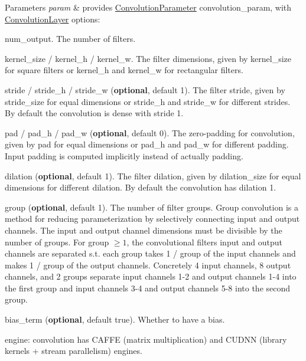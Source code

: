 \begin{DoxyParams}{Parameters}
{\em param} & provides \mbox{\hyperlink{classcaffe_1_1_convolution_parameter}{Convolution\+Parameter}} convolution\+\_\+param, with \mbox{\hyperlink{classcaffe_1_1_convolution_layer}{Convolution\+Layer}} options\+:
\begin{DoxyItemize}
\item num\+\_\+output. The number of filters.
\item kernel\+\_\+size / kernel\+\_\+h / kernel\+\_\+w. The filter dimensions, given by kernel\+\_\+size for square filters or kernel\+\_\+h and kernel\+\_\+w for rectangular filters.
\item stride / stride\+\_\+h / stride\+\_\+w ({\bfseries optional}, default 1). The filter stride, given by stride\+\_\+size for equal dimensions or stride\+\_\+h and stride\+\_\+w for different strides. By default the convolution is dense with stride 1.
\item pad / pad\+\_\+h / pad\+\_\+w ({\bfseries optional}, default 0). The zero-\/padding for convolution, given by pad for equal dimensions or pad\+\_\+h and pad\+\_\+w for different padding. Input padding is computed implicitly instead of actually padding.
\item dilation ({\bfseries optional}, default 1). The filter dilation, given by dilation\+\_\+size for equal dimensions for different dilation. By default the convolution has dilation 1.
\item group ({\bfseries optional}, default 1). The number of filter groups. Group convolution is a method for reducing parameterization by selectively connecting input and output channels. The input and output channel dimensions must be divisible by the number of groups. For group $ \geq 1 $, the convolutional filters\textquotesingle{} input and output channels are separated s.\+t. each group takes 1 / group of the input channels and makes 1 / group of the output channels. Concretely 4 input channels, 8 output channels, and 2 groups separate input channels 1-\/2 and output channels 1-\/4 into the first group and input channels 3-\/4 and output channels 5-\/8 into the second group.
\item bias\+\_\+term ({\bfseries optional}, default true). Whether to have a bias.
\item engine\+: convolution has C\+A\+F\+FE (matrix multiplication) and C\+U\+D\+NN (library kernels + stream parallelism) engines. 
\end{DoxyItemize}\\
\hline
\end{DoxyParams}
\mbox{\label{classcaffe_1_1_convolution_layer_ad27360afd7729001b9e4f1d8c8401866}} 
